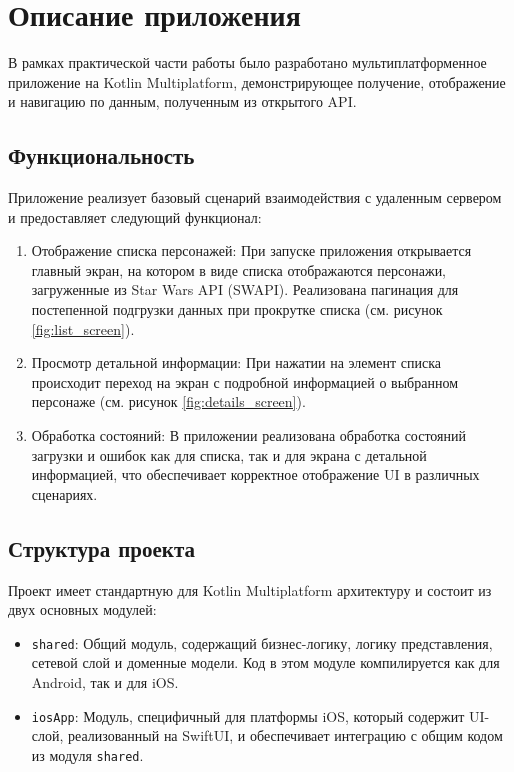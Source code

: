 \documentclass[14pt, russian]{scrartcl}
\begin{document}
\section{Описание приложения}

В рамках практической части работы было разработано мультиплатформенное приложение на Kotlin Multiplatform, демонстрирующее получение, отображение и навигацию по данным, полученным из открытого API.

\subsection{Функциональность}

Приложение реализует базовый сценарий взаимодействия с удаленным сервером и предоставляет следующий функционал:

\begin{enumerate}
    \item Отображение списка персонажей: При запуске приложения открывается главный экран, на котором в виде списка отображаются персонажи, загруженные из Star Wars API (SWAPI). Реализована пагинация для постепенной подгрузки данных при прокрутке списка (см. рисунок \ref{fig:list_screen}).
    \item Просмотр детальной информации: При нажатии на элемент списка происходит переход на экран с подробной информацией о выбранном персонаже (см. рисунок \ref{fig:details_screen}).
    \item Обработка состояний: В приложении реализована обработка состояний загрузки и ошибок как для списка, так и для экрана с детальной информацией, что обеспечивает корректное отображение UI в различных сценариях.
\end{enumerate}

\subsection{Структура проекта}

Проект имеет стандартную для Kotlin Multiplatform архитектуру и состоит из двух основных модулей:

\begin{itemize}
    \item \texttt{shared}: Общий модуль, содержащий бизнес-логику, логику представления, сетевой слой и доменные модели. Код в этом модуле компилируется как для Android, так и для iOS.
    \item \texttt{iosApp}: Модуль, специфичный для платформы iOS, который содержит UI-слой, реализованный на SwiftUI, и обеспечивает интеграцию с общим кодом из модуля \texttt{shared}.
\end{itemize}
\end{document}
